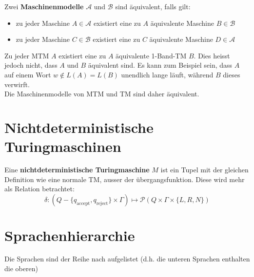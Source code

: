 \documentclass[11pt]{article}
\begin{document}
Zwei \textbf{Maschinenmodelle} $\mathcal{A}$ und $\mathcal{B}$ sind {\"a}quivalent, falls gilt:
\begin{itemize}[noitemsep]
	\item zu jeder Maschine $A \in \mathcal{A}$ existiert eine zu $A$ {\"a}quivalente Maschine $B \in \mathcal{B}$
	\item zu jeder Maschine $C \in \mathcal{B}$ existiert eine zu $C$ {\"a}quivalente Maschine $D \in \mathcal{A}$
\end{itemize}

Zu jeder MTM $A$ existiert eine zu $A$ {\"a}quivalente 1-Band-TM $B$. Dies heisst jedoch nicht, dass $A$ und $B$ {\"a}quivalent sind. Es kann zum Beispiel sein, dass $A$ auf einem Wort $w \not\in L(A) = L(B)$ unendlich lange l{\"a}uft, w{\"a}hrend $B$ dieses verwirft. \\
Die Maschinenmodelle von MTM und TM sind daher {\"a}quivalent.

\section{Nichtdeterministische Turingmaschinen}

Eine \textbf{nichtdeterministische Turingmaschine} $M$ ist ein Tupel mit der gleichen Definition wie eine normale TM, ausser der {\"u}bergangsfunktion. Diese wird mehr als Relation betrachtet:
\begin{equation*}
	\delta: (Q-\{q_\text{accept}, q_\text{reject}\}\times\Gamma) \mapsto \mathcal{P}(Q\times\Gamma\times\{L,R,N\})
\end{equation*}

\section{Sprachenhierarchie}

Die Sprachen sind der Reihe nach aufgelistet (d.h. die unteren Sprachen enthalten die oberen)
\end{document}
